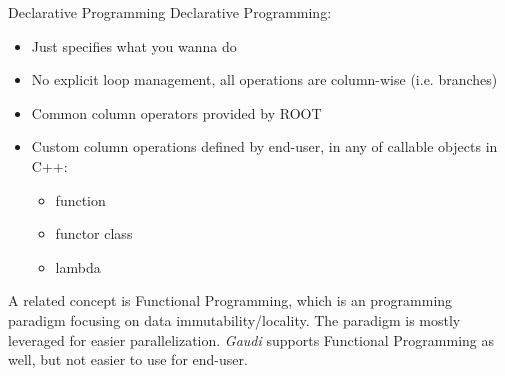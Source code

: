 \documentclass[11pt,t,aspectratio=169]{beamer}
\begin{document}
\begin{frame}[fragile]{Declarative Programming}
  Declarative Programming:
  \begin{itemize}
  \item Just specifies what you wanna do
  \item No explicit loop management, all operations are column-wise (i.e. branches)
  \item Common column operators provided by ROOT
  \item Custom column operations defined by end-user, in any of callable objects
    in C++:
    \begin{itemize}
    \item function
    \item functor class
    \item lambda
    \end{itemize}
  \end{itemize}

\vfill
A related concept is Functional Programming, which is an programming paradigm
focusing on data immutability/locality. The paradigm is mostly leveraged for
easier parallelization.
\textit{Gaudi} supports Functional Programming as well, but not easier to use
for end-user.

\end{frame}
\end{document}
